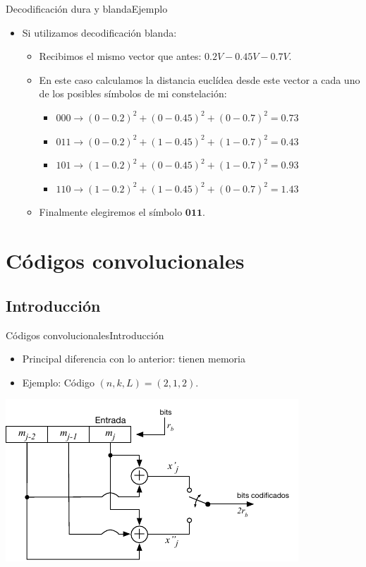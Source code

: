 \documentclass[10pt,compress]{beamer} %
\begin{document}
\begin{frame}{Decodificación dura y blanda}{Ejemplo}
  \begin{itemize}
    \item Si utilizamos decodificación blanda: 
    \begin{itemize}
      \item Recibimos el mismo vector que antes: $0.2V - 0.45V-0.7V$.
      \item En este caso calculamos la distancia euclídea desde este vector a cada uno de los posibles símbolos de mi constelación:
      \begin{itemize}
        \item $000 \rightarrow (0 - 0.2)^2 + (0-0.45)^2 + (0-0.7)^2 = 0.73$
        \item $011 \rightarrow (0 - 0.2)^2 + (1-0.45)^2 + (1-0.7)^2 = 0.43$
        \item $101 \rightarrow (1 - 0.2)^2 + (0-0.45)^2 + (1-0.7)^2 = 0.93$
        \item $110 \rightarrow (1 - 0.2)^2 + (1-0.45)^2 + (0-0.7)^2 = 1.43$
      \end{itemize}
      \item Finalmente elegiremos el símbolo $\mathbf{011}$.
    \end{itemize}
  \end{itemize}
\end{frame}

\section{Códigos convolucionales}
\subsection{Introducción}
\begin{frame}{Códigos convolucionales}{Introducción}
  \begin{itemize}
    \item Principal diferencia con lo anterior: tienen memoria
    \item Ejemplo: Código $(n,k,L) = (2,1,2)$.
  \end{itemize}
  \centering \includegraphics[width=0.8\linewidth]{Figuras/CodificadorConvolucional.pdf}
\end{frame}
\end{document}
